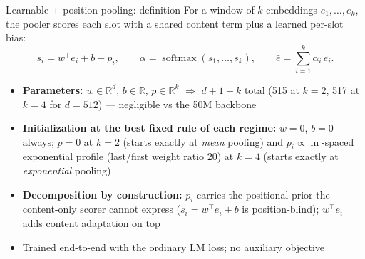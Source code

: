 \documentclass[10pt,aspectratio=169]{beamer}
\begin{document}
\begin{frame}{Learnable + position pooling: definition}
  For a window of $k$ embeddings $e_1, \dots, e_k$, the pooler scores each
  slot with a shared content term plus a learned per-slot bias:
  \[
    s_i = w^\top e_i + b + p_i,\qquad
    \alpha = \operatorname{softmax}(s_1, \dots, s_k),\qquad
    \bar e = \sum_{i=1}^{k} \alpha_i\, e_i .
  \]

  \vspace{0.3em}
  \small
  \begin{itemize}
    \item \textbf{Parameters:} $w \in \mathbb{R}^{d}$, $b \in \mathbb{R}$,
          $p \in \mathbb{R}^{k}$ $\Rightarrow$ $d + 1 + k$ total
          (515 at $k{=}2$, 517 at $k{=}4$ for $d{=}512$) --- negligible vs
          the 50M backbone
    \item \textbf{Initialization at the best fixed rule of each regime:}
          $w = 0$, $b = 0$ always; $p = 0$ at $k{=}2$ (starts exactly at
          \emph{mean} pooling) and $p_i \propto \ln$-spaced exponential
          profile (last/first weight ratio 20) at $k{=}4$ (starts exactly at
          \emph{exponential} pooling)
    \item \textbf{Decomposition by construction:} $p_i$ carries the
          positional prior the content-only scorer cannot express
          ($s_i = w^\top e_i + b$ is position-blind); $w^\top e_i$ adds
          content adaptation on top
    \item Trained end-to-end with the ordinary LM loss; no auxiliary
          objective
  \end{itemize}
\end{frame}
\end{document}
